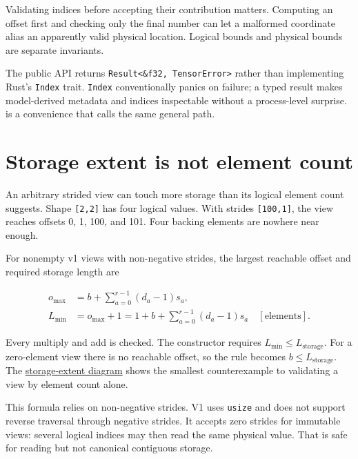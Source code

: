 Validating indices before accepting their contribution matters.
Computing an offset first and checking only the final number can let a
malformed coordinate alias an apparently valid physical location.
Logical bounds and physical bounds are separate invariants.

The public API returns
\texttt{Result\textless{}\&f32,\ TensorError\textgreater{}} rather than
implementing Rust's \texttt{Index} trait. \texttt{Index} conventionally
panics on failure; a typed result makes model-derived metadata and
indices inspectable without a process-level surprise.
\texttt{} is a convenience that calls the
same general path.

\section{Storage extent is not element
count}\label{storage-extent-is-not-element-count}

An arbitrary strided view can touch more storage than its logical
element count suggests. Shape \texttt{{[}2,2{]}} has four logical
values. With strides \texttt{{[}100,1{]}}, the view reaches offsets 0,
1, 100, and 101. Four backing elements are nowhere near enough.

For nonempty v1 views with non-negative strides, the largest reachable
offset and required storage length are

\begin{equation}
\begin{aligned}
o_{\max}&=b+\sum_{a=0}^{r-1}(d_a-1)s_a,\\
L_{\min}&=o_{\max}+1
=1+b+\sum_{a=0}^{r-1}(d_a-1)s_a
\quad[\mathrm{elements}].
\end{aligned}
\end{equation}

Every multiply and add is checked. The constructor requires
\(L_{\min}\le L_{\text{storage}}\). For a zero-element view there is no
reachable offset, so the rule becomes \(b\le L_{\text{storage}}\). The
\href{https://github.com/hermonai/inside-the-llm-engine/blob/astra-visual-rewrite/diagrams/tensor/storage-extent.txt}{storage-extent
diagram} shows the smallest counterexample to validating a view by
element count alone.

This formula relies on non-negative strides. V1 uses \texttt{usize} and
does not support reverse traversal through negative strides. It accepts
zero strides for immutable views: several logical indices may then read
the same physical value. That is safe for reading but not canonical
contiguous storage.

